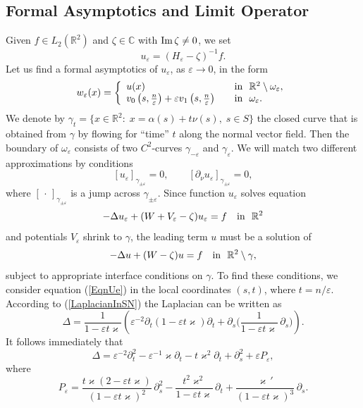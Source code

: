 \documentclass[graybox]{svmult}
\renewcommand{\Im}{\mathop{\rm Im}}
\renewcommand{\kappa}{\varkappa}
\newcommand{\Real}{\mathbb R}
\newcommand{\eps}{\varepsilon}
\newcommand\nep{\textstyle\frac n\eps}
\newcommand{\eqref}[1]{(\ref{#1})}
\begin{document}
\subsection{Formal Asymptotics and Limit Operator}
Given $f\in L_2(\Real^2)$ and $\zeta\in \mathbb{C}$ with  $\Im\zeta\neq0$, we set
\begin{equation}\label{Ueps}
u_\eps=(H_\eps-\zeta)^{-1}f.
\end{equation}
Let us find a formal asymptotics of $u_\eps$, as $\eps\to 0$, in the form
\begin{equation}\label{AsymptoticsWe}
w_\eps(x)=
\left\{
  \begin{array}{ll}
    u(x)&\quad \hbox{in \ }\Real^2\setminus \omega_\eps, \\
    v_0\left(s,\nep\right)+\eps v_1\left(s,\nep\right)
&\quad \hbox{in \ } \omega_\eps.
  \end{array}
\right.
\end{equation}
We denote by $\gamma_t=\{x\in\Real^2\colon\; x=\alpha(s)+t\nu(s), \; s\in S\}$ the closed curve that is obtained from $\gamma$ by flowing for ``time'' $t$ along the normal vector field. Then the boundary of $\omega_\eps$ consists of two $C^2$-curves $\gamma_{-\eps}$ and $\gamma_{\eps}$.
We will match two different approximations by conditions
\begin{equation}\label{MatchingCnds}
  [u_\eps]_{\gamma_{\pm\eps}}=0, \qquad [\partial_\nu u_\eps]_{\gamma_{\pm\eps}}=0,
\end{equation}
where $[\,\cdot\,]_{\gamma_{\pm\eps}}$ is a jump  across $\gamma_{\pm\eps}$.
Since function $u_\eps$ solves equation
\begin{equation}\label{EqnUe}
-\Delta u_\eps +(W+V_\eps-\zeta) u_\eps= f\quad \hbox{in \ } \Real^2
\end{equation}
and potentials $V_\eps$ shrink to $\gamma$,
the leading term $u$ must be a solution of
$$
-\Delta u+(W-\zeta)u= f \quad \hbox{in \ } \Real^2\setminus \gamma,
$$
subject to appropriate interface conditions on $\gamma$. To find these conditions, we consider equation \eqref{EqnUe} in the local coordinates $(s,t)$, where $t=n/\eps$.
According to \eqref{LaplacianInSN} the Laplacian
can be written as
\begin{equation}
  \Delta =\frac1{1-\eps t\kappa}\left( \eps^{-2}\partial_t
(1-\eps t\kappa)\partial_t +\partial_s
\Big(\frac1{1-\eps t\kappa}\,\partial_s\Big)\right).
\end{equation}
It follows immediately that
$$
\Delta= \eps^{-2}\partial^2_t-\eps^{-1}\kappa\partial_t-t \kappa^2\partial_t+\partial^2_s+\eps P_\eps,
$$
where
$$
  P_\eps=\frac{t\kappa(2-\eps t\kappa)}{(1-\eps t\kappa)^2}\,\partial^2_s-\frac{t^2\kappa^2}{1-\eps t\kappa}\,\partial_t+\frac{\kappa\,'}{(1-\eps t\kappa)^3}\,\partial_s.
$$
\end{document}
